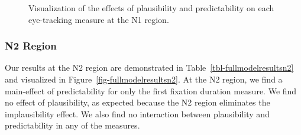 \documentclass[
  12pt,
  letterpaper,
]{scrreport}
\begin{document}
\begin{figure}[htbp]

\caption{\label{fig-fullmodelresultsn1}Visualization of the effects of
plausibility and predictability on each eye-tracking measure at the N1
region.}


\end{figure}%

\subsubsection{N2 Region}\label{n2-region-1}

Our results at the N2 region are demonstrated in
Table~\ref{tbl-fullmodelresultsn2} and visualized in
Figure~\ref{fig-fullmodelresultsn2}. At the N2 region, we find a
main-effect of predictability for only the first fixation duration
measure. We find no effect of plausibility, as expected because the N2
region eliminates the implausibility effect. We also find no interaction
between plausibility and predictability in any of the measures.
\end{document}
